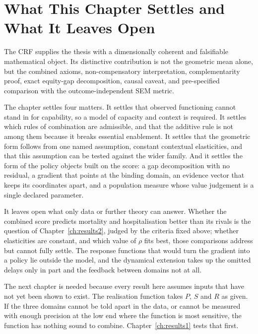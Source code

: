 \section{What This Chapter Settles and What It Leaves Open}
The CRF supplies the thesis with a dimensionally coherent and falsifiable
mathematical object. Its distinctive contribution is not the geometric mean alone,
but the combined axioms, non-compensatory interpretation, complementarity proof,
exact equity-gap decomposition, causal caveat, and pre-specified comparison with
the outcome-independent SEM metric.

The chapter settles four matters. It settles that observed functioning cannot
stand in for capability, so a model of capacity and context is required. It
settles which rules of combination are admissible, and that the additive rule
is not among them because it breaks essential enablement. It settles that the
geometric form follows from one named assumption, constant contextual
elasticities, and that this assumption can be tested against the wider family.
And it settles the form of the policy objects built on the score: a gap
decomposition with no residual, a gradient that points at the binding domain,
an evidence vector that keeps its coordinates apart, and a population measure
whose value judgement is a single declared parameter.

It leaves open what only data or further theory can answer. Whether the
combined score predicts mortality and hospitalisation better than its rivals is
the question of Chapter~\ref{ch:results2}, judged by the criteria fixed above;
whether elasticities are constant, and which value of $\rho$ fits best, those
comparisons address but cannot fully settle. The response functions that would
turn the gradient into a policy lie outside the model, and the dynamical
extension takes up the omitted delays only in part and the feedback between
domains not at all.

The next chapter is needed because every result here assumes inputs that have
not yet been shown to exist. The realisation function takes $P$, $S$ and $R$
as given. If the three domains cannot be told apart in the data, or cannot be
measured with enough precision at the low end where the function is most
sensitive, the function has nothing sound to combine. Chapter~\ref{ch:results1}
tests that first.
